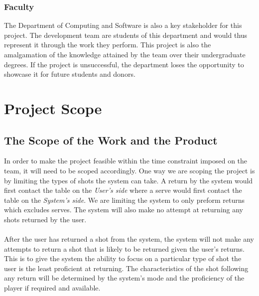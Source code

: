\documentclass[11pt]{article}
\begin{document}
\subsubsection{Faculty}
The Department of Computing and Software is also a key stakeholder for this project. The development team are students of this department and would thus represent it through the work they perform. This project is also the amalgamation of the knowledge attained by the team over their undergraduate degrees. If the project is unsuccessful, the department loses the opportunity to showcase it for future students and donors.

\section{Project Scope}
\subsection{The Scope of the Work and the Product}
In order to make the project feasible within the time constraint imposed on the team, it will need to be scoped accordingly. One way we are scoping the project is by limiting the types of shots the system can take. A return by the system would first contact the table on the \textit{User's side} where a serve would first contact the table on the \textit{System's side}. We are limiting the system to only preform returns which excludes serves. The system will also make no attempt at returning any shots returned by the user. \\\\
After the user has returned a shot from the system, the system will not make any attempts to return a shot that is likely to be returned given the user's returns. This is to give the system the ability to focus on a particular type of shot the user is the least proficient at returning. The characteristics of the shot following any return will be determined by the system's mode and the proficiency of the player if required and available.
\end{document}
